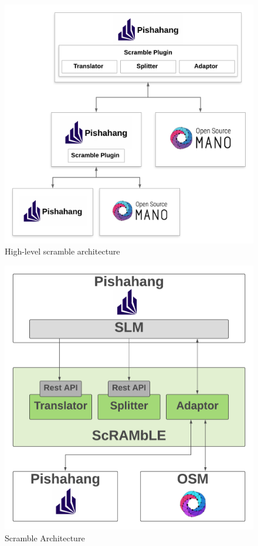 \begin{figure}[h]
	\centering
	\includegraphics[width=0.9\linewidth]{../figures/ScrambleArch}
	\caption{High-level scramble architecture}
	\label{fig:scramble-arch}
\end{figure}

\begin{figure}[h]
	\centering
	\includegraphics[width=0.9\linewidth]{../figures/ScrambleArchitecture}
	\caption{Scramble Architecture}
	\label{fig:scramble-architecture}
\end{figure}
